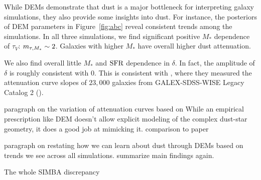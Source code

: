 While DEMs demonstrate that dust is a major bottleneck for interpreting galaxy
simulations, they also provide some insights into dust. For instance, the
posteriors of DEM parameters in Figure~\ref{fig:abc} reveal consistent trends
among the simulations. In all three simulations, we find significant positive
$M_*$ dependence of $\tau_V$: $m_{\tau,M_*} \sim 2$. Galaxies with higher $M_*$ have
overall higher dust attenuation. 

We also find overall little $M_*$ and ${\rm SFR}$ dependence in $\delta$. In
fact, the amplitude of $\delta$ is roughly consistent with 0.  
This is consistent with \cite{salim2020}, where they measured the attenuation
curve slopes of $23,000$ galaxies from GALEX-SDSS-WISE Legacy Catalog 2
(). 

paragraph on the variation of attenuation curves based on 
While an empirical prescription like DEM doesn't allow explicit modeling of the
complex dust-star geometry, it does a good job at mimicking it. 
comparison to \cite{narayanan2018} paper 

paragraph on restating how we can learn about dust through DEMs based on trends we see
across all simulations. summarize main findings again. 

The whole SIMBA discrepancy

